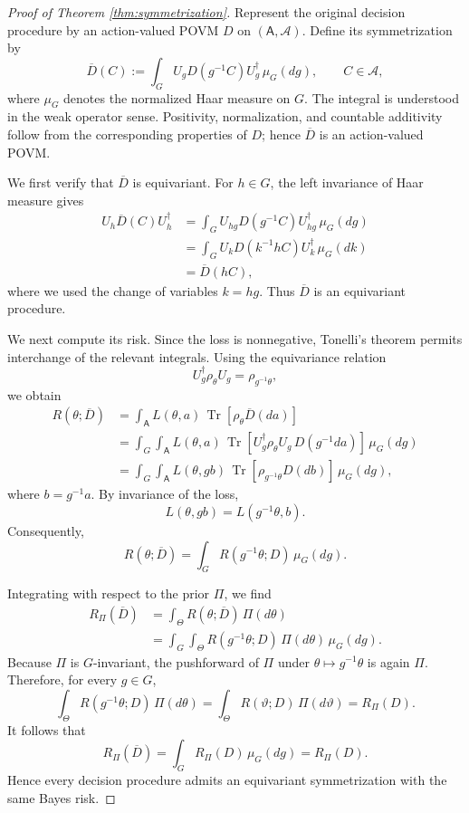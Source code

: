 \documentclass{article}
\theoremstyle{named}
\theoremstyle{named1}
\theoremstyle{plain}
\theoremstyle{remark}
\begin{document}
\begin{proof}[Proof of Theorem \ref{thm:symmetrization}]
Represent the original decision procedure by an action-valued POVM
\(D\) on \((\mathsf A,\mathcal A)\). Define its symmetrization by
\[
\overline D(C)
:=
\int_G U_g D(g^{-1}C)U_g^\dagger\,\mu_G(dg),
\qquad C\in\mathcal A,
\]
where \(\mu_G\) denotes the normalized Haar measure on \(G\). The
integral is understood in the weak operator sense. Positivity,
normalization, and countable additivity follow from the corresponding
properties of \(D\); hence \(\overline D\) is an action-valued POVM.

We first verify that \(\overline D\) is equivariant. For \(h\in G\),
the left invariance of Haar measure gives
\[
\begin{aligned}
U_h\overline D(C)U_h^\dagger
&=
\int_G U_{hg}D(g^{-1}C)U_{hg}^\dagger\,\mu_G(dg)\\
&=
\int_G U_kD(k^{-1}hC)U_k^\dagger\,\mu_G(dk)\\
&=
\overline D(hC),
\end{aligned}
\]
where we used the change of variables \(k=hg\). Thus
\(\overline D\) is an equivariant procedure.

We next compute its risk. Since the loss is nonnegative, Tonelli's
theorem permits interchange of the relevant integrals. Using the
equivariance relation
\[
U_g^\dagger\rho_\theta U_g=\rho_{g^{-1}\theta},
\]
we obtain
\[
\begin{aligned}
R(\theta;\overline D)
&=
\int_{\mathsf A}
L(\theta,a)\,
\operatorname{Tr}\!\left[
    \rho_\theta\overline D(da)
\right]
\\
&=
\int_G\int_{\mathsf A}
L(\theta,a)\,
\operatorname{Tr}\!\left[
    U_g^\dagger\rho_\theta U_g\,D(g^{-1}da)
\right]
\,\mu_G(dg)
\\
&=
\int_G\int_{\mathsf A}
L(\theta,gb)\,
\operatorname{Tr}\!\left[
    \rho_{g^{-1}\theta}D(db)
\right]
\,\mu_G(dg),
\end{aligned}
\]
where \(b=g^{-1}a\). By invariance of the loss,
\[
L(\theta,gb)
=
L(g^{-1}\theta,b).
\]
Consequently,
\[
R(\theta;\overline D)
=
\int_G R(g^{-1}\theta;D)\,\mu_G(dg).
\]

Integrating with respect to the prior \(\Pi\), we find
\[
\begin{aligned}
R_\Pi(\overline D)
&=
\int_\Theta R(\theta;\overline D)\,\Pi(d\theta)\\
&=
\int_G\int_\Theta
R(g^{-1}\theta;D)\,\Pi(d\theta)\,\mu_G(dg).
\end{aligned}
\]
Because \(\Pi\) is \(G\)-invariant, the pushforward of \(\Pi\) under
\(\theta\mapsto g^{-1}\theta\) is again \(\Pi\). Therefore, for every
\(g\in G\),
\[
\int_\Theta R(g^{-1}\theta;D)\,\Pi(d\theta)
=
\int_\Theta R(\vartheta;D)\,\Pi(d\vartheta)
=
R_\Pi(D).
\]
It follows that
\[
R_\Pi(\overline D)
=
\int_G R_\Pi(D)\,\mu_G(dg)
=
R_\Pi(D).
\]
Hence every decision procedure admits an equivariant symmetrization
with the same Bayes risk.
\end{proof}
\end{document}

